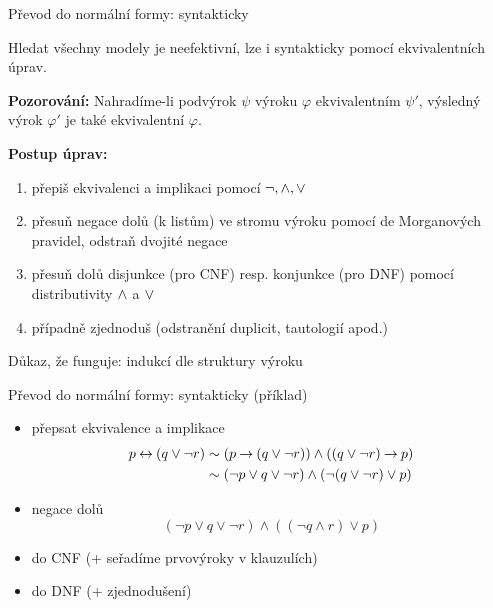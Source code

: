 \documentclass{beamer}
\begin{document}
\begin{frame}{Převod do normální formy: syntakticky}

    Hledat všechny modely je neefektivní, lze i syntakticky pomocí \alert{ekvivalentních úprav}.

    \pause

    \textbf{Pozorování:} Nahradíme-li podvýrok $\psi$ výroku $\varphi$ ekvivalentním $\psi'$, výsledný výrok $\varphi'$ je také ekvivalentní $\varphi$.

    \pause

    \textbf{Postup úprav:}
    \pause
    \begin{enumerate}[<+->]
        \item přepiš ekvivalenci a implikaci pomocí $\neg,{\land},{\lor}$
        \item přesuň negace dolů (k listům) ve stromu výroku pomocí de Morganových pravidel, odstraň dvojité negace
        \item přesuň dolů disjunkce (pro CNF) resp. konjunkce (pro DNF) pomocí distributivity ${\land}$ a ${\lor}$
        \item případně zjednoduš (odstranění duplicit, tautologií apod.)
    \end{enumerate}

    \pause
    Důkaz, že funguje: indukcí dle struktury výroku

\end{frame}


\begin{frame}{Převod do normální formy: syntakticky (příklad)}


   \pause
    \begin{itemize}[<+->]
        \item přepsat ekvivalence a implikace
        \begin{align*}
            p\mathbin{\leftrightarrow} (q\lor \neg r) &\sim (p\mathbin{\rightarrow} (q\lor \neg r)) \land ((q\lor \neg r) \mathbin{\rightarrow} p)\\
            &\sim (\neg p\lor q\lor \neg r) \land (\neg (q\lor \neg r) \lor p)
        \end{align*}
        \item negace dolů
        $$
        (\neg p\lor q\lor \neg r) \land ( (\neg q\land r) \lor p)
        $$
        \item do CNF (+ seřadíme prvovýroky v klauzulích)

        \item do DNF (+ zjednodušení)
    \end{itemize}

\end{frame}
\end{document}
